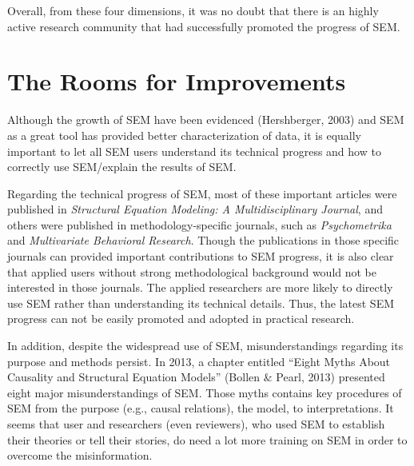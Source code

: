 \documentclass[jou]{apa6}
\theoremstyle{definition}
\theoremstyle{definition}
\theoremstyle{definition}
\theoremstyle{remark}
\begin{document}
Overall, from these four dimensions, it was no doubt that there is an
highly active research community that had successfully promoted the
progress of SEM.

\hypertarget{the-rooms-for-improvements}{%
\section{The Rooms for Improvements}\label{the-rooms-for-improvements}}

\noindent Although the growth of SEM have been evidenced (Hershberger,
2003) and SEM as a great tool has provided better characterization of
data, it is equally important to let all SEM users understand its
technical progress and how to correctly use SEM/explain the results of
SEM.

\setlength{\parindent}{4ex}

Regarding the technical progress of SEM, most of these important
articles were published in \emph{Structural Equation Modeling: A
Multidisciplinary Journal}, and others were published in
methodology-specific journals, such as \emph{Psychometrika} and
\emph{Multivariate Behavioral Research}. Though the publications in
those specific journals can provided important contributions to SEM
progress, it is also clear that applied users without strong
methodological background would not be interested in those journals. The
applied researchers are more likely to directly use SEM rather than
understanding its technical details. Thus, the latest SEM progress can
not be easily promoted and adopted in practical research.

In addition, despite the widespread use of SEM, misunderstandings
regarding its purpose and methods persist. In 2013, a chapter entitled
\enquote{Eight Myths About Causality and Structural Equation Models}
(Bollen \& Pearl, 2013) presented eight major misunderstandings of SEM.
Those myths contains key procedures of SEM from the purpose (e.g.,
causal relations), the model, to interpretations. It seems that user and
researchers (even reviewers), who used SEM to establish their theories
or tell their stories, do need a lot more training on SEM in order to
overcome the misinformation.
\end{document}
